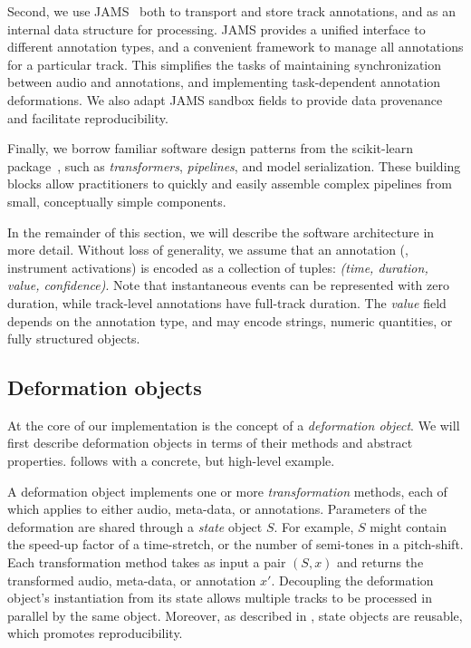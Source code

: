 \documentclass{article}
\begin{document}
Second, we use JAMS~\cite{humphreyjams} both to transport and store track annotations, 
and as an internal data structure for processing.
JAMS provides a unified interface to different annotation types, and a convenient framework to 
manage all annotations for a particular track.
This simplifies the tasks of maintaining synchronization between audio and annotations,
and implementing task-dependent annotation deformations.  
We also adapt JAMS sandbox fields to provide data provenance and facilitate reproducibility.

%
Finally, we borrow familiar software design patterns from the scikit-learn
package~\cite{buitinck2013api}, such as \emph{transformers}, \emph{pipelines}, 
and model serialization.  These building blocks allow
practitioners to quickly and easily assemble complex pipelines 
from small, conceptually simple components.


In the remainder of this section, we will describe the software architecture in more
detail.
Without loss of generality, we assume that an annotation (\eg, instrument activations) is encoded as a collection of tuples: \emph{(time, duration, value, confidence)}.
Note that instantaneous events can be represented with zero duration, while
track-level annotations have full-track duration.  The \emph{value} field depends on
the annotation type, and may encode strings, numeric quantities, or fully structured
objects.

\subsection{Deformation objects}

At the core of our implementation is the concept of a \emph{deformation object}.
We will first describe deformation objects in terms of their methods and abstract
properties.   follows with a concrete, but high-level example.

A deformation object implements one or more \emph{transformation} methods, each of which
applies to either audio, meta-data, or annotations.
Parameters of the deformation are shared through a \emph{state} object $S$.
For example, $S$ might contain the speed-up factor of a
time-stretch, or the number of semi-tones in a pitch-shift.  
Each transformation method takes as input a pair $(S, x)$ and
returns the transformed audio, meta-data, or annotation $x'$.
Decoupling the deformation object's instantiation from
its state allows multiple tracks to be processed in parallel by the same object.
Moreover, as described in , 
state objects are reusable, which promotes reproducibility.
\end{document}
